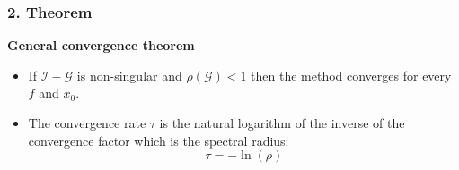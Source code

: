 \begin{frame}
	\frametitle{\textbf{2. Theorem}}

\begin{shaded}
	\textbf{General convergence theorem}
	\begin{itemize}
		\item If $\mathcal{I}-\mathcal{G}$ is non-singular and $\rho(\mathcal{G})<1$ then the method converges for every $f$ and $x_0$.
		\item The convergence rate $\tau$ is the natural logarithm of the inverse of the convergence factor which is the spectral radius:
		\[
		\tau = - \ln \left(\rho\right)
		\]
	\end{itemize}
	
		
\end{shaded}


		
	

\end{frame}

